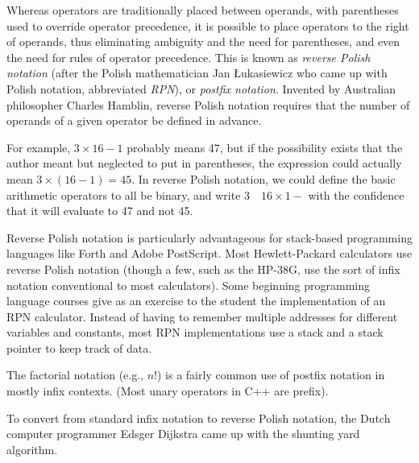 \documentclass[12pt]{article}
\begin{document}
Whereas operators are traditionally placed between operands, with parentheses used to override operator precedence, it is possible to place operators to the right of operands, thus eliminating ambiguity and the need for parentheses, and even the need for rules of operator precedence. This is known as \emph{reverse Polish notation} (after the Polish mathematician Jan \L{}ukasiewicz who came up with Polish notation, abbreviated \emph{RPN}), or \emph{postfix notation}. Invented by Australian philosopher Charles Hamblin, reverse Polish notation requires that the number of operands of a given operator be defined in advance.

For example, $3 \times 16 - 1$ probably means 47, but if the possibility exists that the author meant but neglected to put in parentheses, the expression could actually mean $3 \times (16 - 1) = 45$. In reverse Polish notation, we could define the basic arithmetic operators to all be binary, and write $3 \quad 16 \times 1 -$ with the confidence that it will evaluate to 47 and not 45.

Reverse Polish notation is particularly advantageous for stack-based programming languages like Forth and Adobe PostScript. Most Hewlett-Packard calculators use reverse Polish notation (though a few, such as the HP-38G, use the sort of infix notation conventional to most calculators). Some beginning programming language courses give as an exercise to the student the implementation of an RPN calculator. Instead of having to remember multiple addresses for different variables and constants, most RPN implementations use a stack and a stack pointer to keep track of data.

The factorial notation (e.g., $n!$) is a fairly common use of postfix notation in mostly infix contexts. (Most unary operators in C++ are prefix).

To convert from standard infix notation to reverse Polish notation, the Dutch computer programmer Edsger Dijkstra came up with the shunting yard algorithm.
\end{document}
